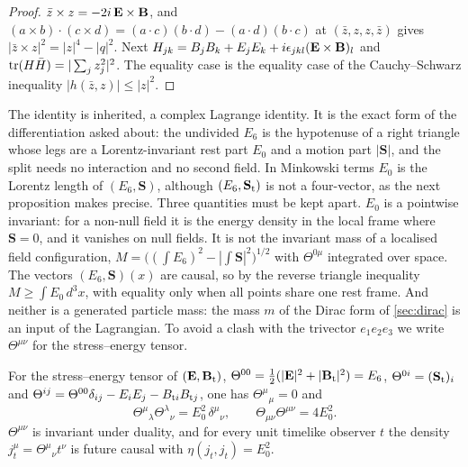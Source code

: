 \begin{proof}
$\bar z\times z=-2i\,\mathbf E\times\mathbf B$, and $(a\times b)\cdot(c\times d)=(a\cdot c)(b\cdot d)-(a\cdot d)(b\cdot c)$ at $(\bar z,z,z,\bar z)$ gives
$|\bar z\times z|^2=|z|^4-|q|^2$. Next $H_{jk}=B_jB_k+E_jE_k+i\epsilon_{jkl}(\mathbf E\times\mathbf B)_l$ and $\operatorname{tr}(H\bar H)=|\sum_jz_j^2|^2$. The equality case is the
equality case of the Cauchy--Schwarz inequality $|h(\bar z,z)|\le|z|^2$.
\end{proof}

The identity is inherited, a complex Lagrange identity. It is the exact form of the differentiation asked about: the undivided $E_6$ is the
hypotenuse of a right triangle whose legs are a Lorentz-invariant rest part $E_0$ and a motion part $|\mathbf S|$, and the split needs no
interaction and no second field. In Minkowski terms $E_0$ is the Lorentz length of $(E_6,\mathbf S)$, although $(E_6,\mathbf S_{\rm t})$ is not a
four-vector, as the next proposition makes precise. Three quantities must be kept apart. $E_0$ is a pointwise invariant: for a non-null field it
is the energy density in the local frame where $\mathbf S=0$, and it vanishes on null fields. It is not the invariant mass of a localised field
configuration, $M=\bigl((\int E_6)^2-|\int\mathbf S|^2\bigr)^{1/2}$ with $\Theta^{0\mu}$ integrated over space. The vectors $(E_6,\mathbf S)(x)$ are causal, so by the
reverse triangle inequality $M\ge\int E_0\,d^3x$, with equality only when all points share one rest frame. And neither is a generated particle mass: the
mass $m$ of the Dirac form of \cref{sec:dirac} is an input of the Lagrangian. To avoid a clash with the trivector $e_1e_2e_3$ we write $\Theta^{\mu\nu}$ for the
stress--energy tensor.

\begin{proposition}
\label{en:rainich}
For the stress--energy tensor of $(\mathbf E,\mathbf B_{\rm t})$, $\Theta^{00}=\tfrac12(|\mathbf E|^2+|\mathbf B_{\rm t}|^2)=E_6$, $\Theta^{0i}=(\mathbf S_{\rm t})_i$ and
$\Theta^{ij}=\Theta^{00}\delta_{ij}-E_iE_j-B_{{\rm t}i}B_{{\rm t}j}$, one has $\Theta^\mu{}_\mu=0$ and
\begin{equation}
\label{en:rainicheq}
\Theta^\mu{}_\lambda\Theta^\lambda{}_\nu=E_0^2\,\delta^\mu{}_\nu ,\qquad \Theta_{\mu\nu}\Theta^{\mu\nu}=4E_0^2 .
\end{equation}
$\Theta^{\mu\nu}$ is invariant under duality, and for every unit timelike observer $t$ the density $j_t^\mu=\Theta^\mu{}_\nu t^\nu$ is future
causal with $\eta(j_t,j_t)=E_0^2$.
\end{proposition}

